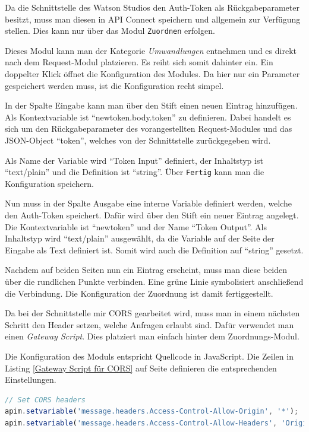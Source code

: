 Da die Schnittstelle des Watson Studios den Auth-Token als Rückgabeparameter besitzt, muss man diesen in API Connect
speichern und allgemein zur Verfügung stellen. Dies kann nur über das Modul \texttt{Zuordnen} erfolgen.

Dieses Modul kann man der Kategorie \textit{Umwandlungen} entnehmen und es direkt nach dem Request-Modul platzieren. Es
reiht sich somit dahinter ein. Ein doppelter Klick öffnet die Konfiguration des Modules. Da hier nur ein Parameter
gespeichert werden muss, ist die Konfiguration recht simpel.

In der Spalte Eingabe kann man über den Stift einen neuen Eintrag hinzufügen. Als Kontextvariable ist
\enquote{newtoken.body.token} zu definieren. Dabei handelt es sich um den Rückgabeparameter des vorangestellten
Request-Modules und das JSON-Object \enquote{token}, welches von der Schnittstelle zurückgegeben wird.

Als Name der Variable wird \enquote{Token Input} definiert, der Inhaltstyp ist \enquote{text/plain} und die Definition
ist \enquote{string}. Über \texttt{Fertig} kann man die Konfiguration speichern.

Nun muss in der Spalte Ausgabe eine interne Variable definiert werden, welche den Auth-Token speichert. Dafür wird über
den Stift ein neuer Eintrag angelegt. Die Kontextvariable ist \enquote{newtoken} und der Name \enquote{Token Output}.
Als Inhaltstyp wird \enquote{text/plain} ausgewählt, da die Variable auf der Seite der Eingabe als Text definiert ist.
Somit wird auch die Definition auf \enquote{string} gesetzt.

Nachdem auf beiden Seiten nun ein Eintrag erscheint, muss man diese beiden über die rundlichen Punkte verbinden. Eine
grüne Linie symbolisiert anschließend die Verbindung. Die Konfiguration der Zuordnung ist damit fertiggestellt.

Da bei der Schnittstelle mir CORS gearbeitet wird, muss man in einem nächsten Schritt den Header setzen, welche Anfragen
erlaubt sind. Dafür verwendet man einen \textit{Gateway Script}. Dies platziert man einfach hinter dem Zuordnungs-Modul.

Die Konfiguration des Moduls entspricht Quellcode in JavaScript. Die Zeilen in Listing \ref{Gateway Script für CORS} auf
Seite \pageref{Gateway Script für CORS} definieren die entsprechenden Einstellungen.

\begin{lstlisting}[language=JavaScript, caption=Gateway Script für CORS, label=Gateway Script für CORS]
// Set CORS headers
apim.setvariable('message.headers.Access-Control-Allow-Origin', '*');
apim.setvariable('message.headers.Access-Control-Allow-Headers', 'Origin, X-Requested-With, Content-Type, Accept');
\end{lstlisting}

